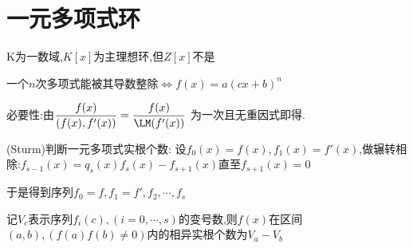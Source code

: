 \section{一元多项式环}
K为一数域,$ K[x]$为主理想环,但$ Z[x]$不是

一个$ n$次多项式能被其导数整除$ \Leftrightarrow f(x)=a(cx+b)^n$

必要性:由$ \dfrac{f(x)}{(f(x),f'(x))}=\dfrac{f(x)}{\LM(f'(x))}$
为一次且无重因式即得.

(Sturm)判断一元多项式实根个数:
设$ f_0(x)=f(x), f_1(x)=f'(x)$,做辗转相除:$ f_{s-1}(x)=q_s(x)f_s(x)-f_{s+1}(x)$直至$ f_{s+1}(x)=0$

于是得到序列$ f_0=f,f_1=f',f_2,\cdots,f_s$

记$ V_c$表示序列$ f_i(c),(i=0,\cdots,s)$的变号数,则$ f(x)$在区间$ (a,b),(f(a)f(b)\ne 0)$内的相异实根个数为$ V_a-V_b $
